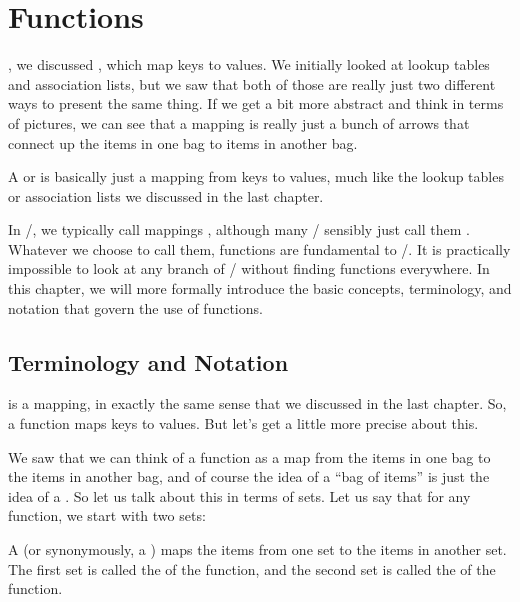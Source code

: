 \documentclass[../../../main.tex]{subfiles}
\begin{document}
\chapter{Functions}
\label{ch:functions}

, we discussed , which map keys to values. We initially looked at lookup tables and association lists, but we saw that both of those are really just two different ways to present the same thing. If we get a bit more abstract and think in terms of pictures, we can see that a mapping is really just a bunch of arrows that connect up the items in one bag to items in another bag.

\begin{terminology}
  A  or  is basically just a mapping from keys to values, much like the lookup tables or association lists we discussed in the last chapter.
\end{terminology}

In \math/, we typically call mappings , although many \mathers/ sensibly just call them . Whatever we choose to call them, functions are fundamental to \math/. It is practically impossible to look at any branch of \math/ without finding functions everywhere. In this chapter, we will more formally introduce the basic concepts, terminology, and notation that govern the use of functions.


\section{Terminology and Notation}

 is a mapping, in exactly the same sense that we discussed in the last chapter. So, a function maps keys to values. But let's get a little more precise about this. 

We saw that we can think of a function as a map from the items in one bag to the items in another bag, and of course the idea of a ``bag of items'' is just the idea of a . So let us talk about this in terms of sets. Let us say that for any function, we start with two sets:

\begin{terminology}
  A  (or synonymously, a ) maps the items from one set to the items in another set. The first set is called the  of the function, and the second set is called the  of the function. 
\end{terminology}
\end{document}
